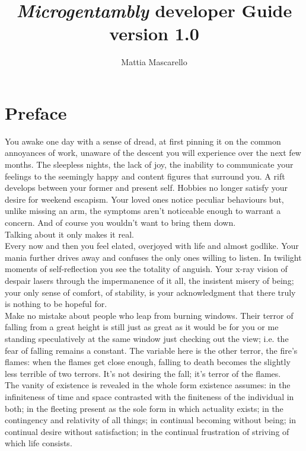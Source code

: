 \documentclass[]{article}
\title{\emph{Microgentambly} developer Guide\\ \small version 1.0}
\author{Mattia Mascarello}
\begin{document}
	
		\maketitle
		\newpage
		\tableofcontents
		\newpage
		\part{Preface}
		
		
		You awake one day with a sense of dread, at first pinning it on the common annoyances of work, unaware of the descent you will experience over the next few months. The sleepless nights, the lack of joy, the inability to communicate your feelings to the seemingly happy and content figures that surround you. A rift develops between your former and present self. Hobbies no longer satisfy your desire for weekend escapism. Your loved ones notice peculiar behaviours but, unlike missing an arm, the symptoms aren’t noticeable enough to warrant a concern. And of course you wouldn’t want to bring them down.\\
		
		Talking about it only makes it real.\\
		
		Every now and then you feel elated, overjoyed with life and almost godlike. Your mania further drives away and confuses the only ones willing to listen. In twilight moments of self-reflection you see the totality of anguish. Your x-ray vision of despair lasers through the impermanence of it all, the insistent misery of being; your only sense of comfort, of stability, is your acknowledgment that there truly is nothing to be hopeful for.\\
		
		Make no mistake about people who leap from burning windows. Their terror of falling from a great height is still just as great as it would be for you or me standing speculatively at the same window just checking out the view; i.e. the fear of falling remains a constant. The variable here is the other terror, the fire’s flames: when the flames get close enough, falling to death becomes the slightly less terrible of two terrors. It’s not desiring the fall; it’s terror of the flames. \\
		
		The vanity of existence is revealed in the whole form existence assumes: in the infiniteness of time and space contrasted with the finiteness of the individual in both; in the fleeting present as the sole form in which actuality exists; in the contingency and relativity of all things; in continual becoming without being; in continual desire without satisfaction; in the continual frustration of striving of which life consists.
		\\
		
\end{document}
